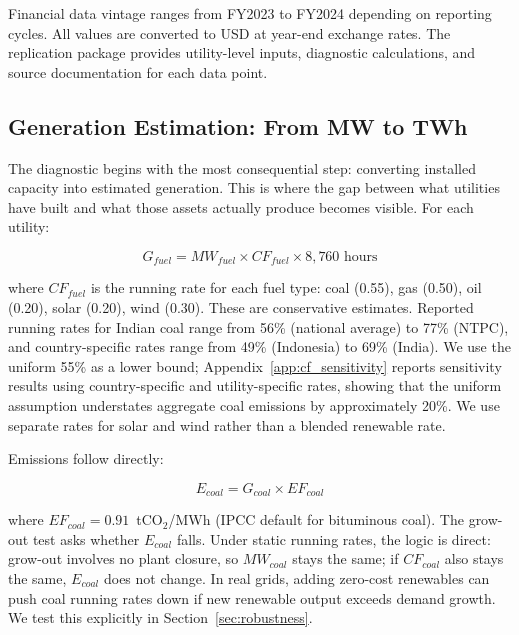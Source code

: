 \documentclass[review,3p,authoryear]{elsarticle}
\begin{document}
Financial data vintage ranges from FY2023 to FY2024 depending on reporting cycles. All values are converted to USD at year-end exchange rates. The replication package provides utility-level inputs, diagnostic calculations, and source documentation for each data point.

\subsection{Generation Estimation: From MW to TWh}
\label{sec:mw_twh}

The diagnostic begins with the most consequential step: converting installed capacity into estimated generation. This is where the gap between what utilities have built and what those assets actually produce becomes visible. For each utility:

\begin{equation}
G_{fuel} = MW_{fuel} \times CF_{fuel} \times 8{,}760 \text{ hours}
\end{equation}

\noindent where $CF_{fuel}$ is the running rate for each fuel type: coal (0.55), gas (0.50), oil (0.20), solar (0.20), wind (0.30). These are conservative estimates. Reported running rates for Indian coal range from 56\% (national average) to 77\% (NTPC), and country-specific rates range from 49\% (Indonesia) to 69\% (India). We use the uniform 55\% as a lower bound; Appendix~\ref{app:cf_sensitivity} reports sensitivity results using country-specific and utility-specific rates, showing that the uniform assumption understates aggregate coal emissions by approximately 20\%. We use separate rates for solar and wind rather than a blended renewable rate.

Emissions follow directly:

\begin{equation}
E_{coal} = G_{coal} \times EF_{coal}
\end{equation}

\noindent where $EF_{coal} = 0.91$~tCO$_2$/MWh (IPCC default for bituminous coal). The grow-out test asks whether $E_{coal}$ falls. Under static running rates, the logic is direct: grow-out involves no plant closure, so $MW_{coal}$ stays the same; if $CF_{coal}$ also stays the same, $E_{coal}$ does not change. In real grids, adding zero-cost renewables can push coal running rates down if new renewable output exceeds demand growth. We test this explicitly in Section~\ref{sec:robustness}.
\end{document}
